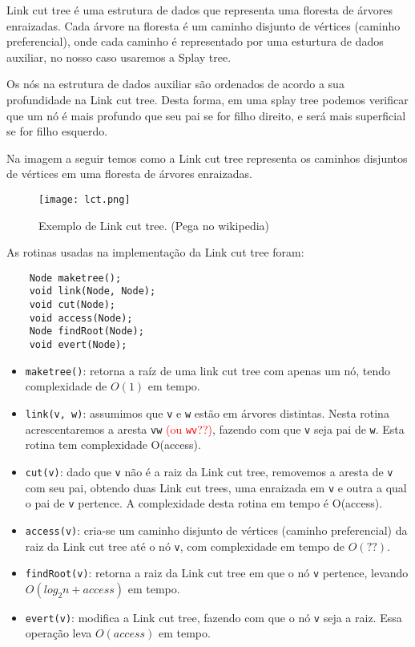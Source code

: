 Link cut tree é uma estrutura de dados que representa uma floresta de árvores enraizadas. Cada árvore na floresta é um caminho disjunto de vértices (caminho preferencial), onde cada caminho é representado por uma esturtura de dados auxiliar, no nosso caso usaremos a Splay tree.  

Os nós na estrutura de dados auxiliar são ordenados de acordo a sua profundidade na Link cut tree. Desta forma, em uma splay tree podemos verificar que um nó é mais profundo que seu pai se for filho direito, e será mais superficial se for filho esquerdo.~\cite{WikipediaLCT}  

Na imagem a seguir temos como a Link cut tree representa os caminhos disjuntos de vértices em uma floresta de árvores enraizadas.
\begin{figure}
    \centering
    \texttt{[image: lct.png]}
    \caption{Exemplo de Link cut tree. (Pega no wikipedia)}
\end{figure}

As rotinas usadas na implementação da Link cut tree foram:  
\begin{verbatim}
    Node maketree();
    void link(Node, Node);
    void cut(Node);
    void access(Node);
    Node findRoot(Node);
    void evert(Node);
\end{verbatim}

\begin{itemize}
    \item \texttt{maketree()}: retorna a raíz de uma link cut tree com apenas um nó, tendo complexidade de $O(1)$ em tempo.  
    \item \texttt{link(v, w)}: assumimos que \texttt{v} e \texttt{w} estão em árvores distintas. Nesta rotina acrescentaremos a aresta \texttt{vw} \textcolor{red}{(ou \texttt{wv}??)}, fazendo com que \texttt{v} seja pai de \texttt{w}. Esta rotina tem complexidade O(access).  
    \item \texttt{cut(v)}: dado que \texttt{v} não é a raiz da Link cut tree, removemos a aresta de \texttt{v} com seu pai, obtendo duas Link cut trees, uma enraizada em \texttt{v} e outra a qual o pai de \texttt{v} pertence. A complexidade desta rotina em tempo é O(access).  
    \item \texttt{access(v)}: cria-se um caminho disjunto de vértices (caminho preferencial) da raiz da Link cut tree até o nó \texttt{v}, com complexidade em tempo de $O(??)$.  
    \item \texttt{findRoot(v)}: retorna a raiz da Link cut tree em que o nó \texttt{v} pertence, levando $O(log_2 n + access)$ em tempo.  
    \item \texttt{evert(v)}: modifica a Link cut tree, fazendo com que o nó \texttt{v} seja a raiz. Essa operação leva $O(access)$ em tempo.  
\end{itemize}




\newpage

